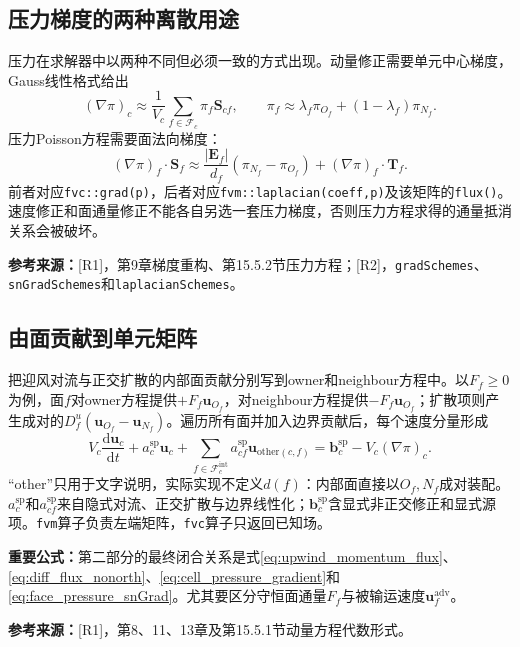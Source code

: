 \documentclass[UTF8,12pt,a4paper]{ctexart}
\numberwithin{equation}{section}
\newcommand{\Rone}{\textnormal{[R1]}}
\newcommand{\Rtwo}{\textnormal{[R2]}}
\newcommand{\source}[1]{\par\smallskip\noindent\colorbox{sourcebg}{%
  \parbox{0.955\linewidth}{\footnotesize\color{sourcegray}\textbf{参考来源：}#1}}\par\smallskip}
\newcommand{\keytitle}[1]{\par\smallskip\noindent\colorbox{keybg}{%
  \parbox{0.965\linewidth}{\color{keyblue}\textbf{重要公式：}#1}}\par\smallskip}
\begin{document}
\subsection{压力梯度的两种离散用途}
压力在求解器中以两种不同但必须一致的方式出现。动量修正需要单元中心梯度，Gauss线性格式给出
\begin{equation}
  \boxed{(\nabla\pi)_c\approx\frac{1}{V_c}
  \sum_{f\in\mathcal F_c}\pi_f\bm S_{cf},
  \qquad
  \pi_f\approx\lambda_f\pi_{O_f}+(1-\lambda_f)\pi_{N_f}.}
  \label{eq:cell_pressure_gradient}
\end{equation}
压力Poisson方程需要面法向梯度：
\begin{equation}
  \boxed{(\nabla\pi)_f\cdot\bm S_f
  \approx\frac{|\bm E_f|}{d_f}(\pi_{N_f}-\pi_{O_f})
  +(\nabla\pi)_f\cdot\bm T_f.}
  \label{eq:face_pressure_snGrad}
\end{equation}
前者对应\texttt{fvc::grad(p)}，后者对应\texttt{fvm::laplacian(coeff,p)}及该矩阵的\texttt{flux()}。速度修正和面通量修正不能各自另选一套压力梯度，否则压力方程求得的通量抵消关系会被破坏。
\source{\Rone，第9章梯度重构、第15.5.2节压力方程；\Rtwo，\texttt{gradSchemes}、\texttt{snGradSchemes}和\texttt{laplacianSchemes}。}

\subsection{由面贡献到单元矩阵}
把迎风对流与正交扩散的内部面贡献分别写到owner和neighbour方程中。以$F_f\ge0$为例，面$f$对owner方程提供$+F_f\bm u_{O_f}$，对neighbour方程提供$-F_f\bm u_{O_f}$；扩散项则产生成对的$D_f^u(\bm u_{O_f}-\bm u_{N_f})$。遍历所有面并加入边界贡献后，每个速度分量形成
\begin{equation}
  \boxed{V_c\frac{\mathrm d\bm u_c}{\mathrm dt}
  +a_c^{\mathrm{sp}}\bm u_c+
  \sum_{f\in\mathcal F_c^{\mathrm{int}}}
  a_{cf}^{\mathrm{sp}}\bm u_{\mathrm{other}(c,f)}
  =\bm b_c^{\mathrm{sp}}-V_c(\nabla\pi)_c.}
  \label{eq:predictor_algebra}
\end{equation}
“other”只用于文字说明，实际实现不定义$d(f)$：内部面直接以$O_f,N_f$成对装配。$a_c^{\mathrm{sp}}$和$a_{cf}^{\mathrm{sp}}$来自隐式对流、正交扩散与边界线性化；$\bm b_c^{\mathrm{sp}}$含显式非正交修正和显式源项。\texttt{fvm}算子负责左端矩阵，\texttt{fvc}算子只返回已知场。
\keytitle{第二部分的最终闭合关系是式\eqref{eq:upwind_momentum_flux}、\eqref{eq:diff_flux_nonorth}、\eqref{eq:cell_pressure_gradient}和\eqref{eq:face_pressure_snGrad}。尤其要区分守恒面通量$F_f$与被输运速度$\bm u_f^{\mathrm{adv}}$。}
\source{\Rone，第8、11、13章及第15.5.1节动量方程代数形式。}
\end{document}
